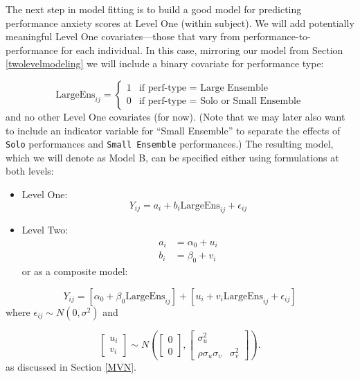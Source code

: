 \documentclass[
]{krantz}
\providecommand{\tightlist}{%
  \setlength{\itemsep}{0pt}\setlength{\parskip}{0pt}}
\begin{document}
The next step in model fitting is to build a good model for predicting performance anxiety scores at Level One (within subject). We will add potentially meaningful Level One covariates---those that vary from performance-to-performance for each individual.  In this case, mirroring our model from Section \ref{twolevelmodeling} we will include a binary covariate for performance type:

\[ \textrm{LargeEns}_{ij} = \begin{cases} 1  & \textrm{if perf-type = Large Ensemble} \\
    0  & \textrm{if perf-type = Solo or Small Ensemble}\end{cases}\]
and no other Level One covariates (for now). (Note that we may later also want to include an indicator variable for ``Small Ensemble'' to separate the effects of \texttt{Solo} performances and \texttt{Small\ Ensemble} performances.) The resulting model, which we will denote as Model B, can be specified either using formulations at both levels:

\begin{itemize}
\tightlist
\item
  Level One:
  \begin{equation*}
  Y_{ij} = a_{i}+b_{i}\textrm{LargeEns}_{ij}+\epsilon_{ij}
  \end{equation*}
\item
  Level Two:
  \begin{align*}
  a_{i} & = \alpha_{0}+u_{i} \\
  b_{i} & = \beta_{0}+v_{i}
  \end{align*}
  or as a composite model:
\end{itemize}

\begin{equation*}
Y_{ij}=[\alpha_{0}+\beta_{0}\textrm{LargeEns}_{ij}]+[u_{i}+v_{i}\textrm{LargeEns}_{ij}+\epsilon_{ij}]
\end{equation*}
where \(\epsilon_{ij}\sim N(0,\sigma^2)\) and

\[ \left[ \begin{array}{c}
            u_{i} \\ v_{i}
          \end{array}  \right] \sim N \left( \left[
          \begin{array}{c}
            0 \\ 0
          \end{array} \right], \left[
          \begin{array}{cc}
            \sigma_{u}^{2} & \\
            \rho\sigma_{u}\sigma_{v} & \sigma_{v}^{2}
          \end{array} \right] \right). \]
as discussed in Section \ref{MVN}.
\end{document}
